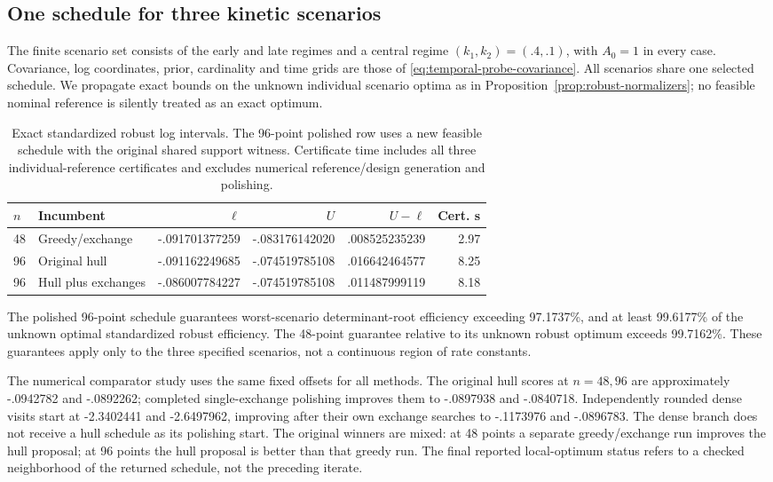 \subsection{One schedule for three kinetic scenarios}\label{subsec:robust-experiments}

The finite scenario set consists of the early and late regimes and a central
regime $(k_1,k_2)=(.4,.1)$, with $A_0=1$ in every case. Covariance, log
coordinates, prior, cardinality and time grids are those of
\eqref{eq:temporal-probe-covariance}. All scenarios share one selected schedule.
We propagate exact bounds on the unknown individual scenario optima as in
Proposition~\ref{prop:robust-normalizers}; no feasible nominal reference is
silently treated as an exact optimum.

\begin{table}[htbp]
\centering\small
\caption{Exact standardized robust log intervals. The 96-point polished row
uses a new feasible schedule with the original shared support witness.
Certificate time includes all three individual-reference certificates and
excludes numerical reference/design generation and polishing.}
\label{tab:robust-certificates}
\begin{tabular}{llrrrr}
\toprule
$n$ & Incumbent & $\ell$ & $U$ & $U-\ell$ & Cert. s\\
\midrule
48 & Greedy/exchange & -.091701377259 & -.083176142020 & .008525235239 & 2.97\\
96 & Original hull & -.091162249685 & -.074519785108 & .016642464577 & 8.25\\
96 & Hull plus exchanges & -.086007784227 & -.074519785108 & .011487999119 & 8.18\\
\bottomrule
\end{tabular}
\end{table}

The polished 96-point schedule guarantees worst-scenario determinant-root
efficiency exceeding 97.1737\%, and at least 99.6177\% of the unknown optimal
standardized robust efficiency. The 48-point guarantee relative to its unknown
robust optimum exceeds 99.7162\%. These guarantees apply only to the three
specified scenarios, not a continuous region of rate constants.

The numerical comparator study uses the same fixed offsets for all methods.
The original hull scores at $n=48,96$ are approximately -.0942782 and
-.0892262; completed single-exchange polishing improves them to -.0897938
and -.0840718. Independently rounded dense visits start at -2.3402441 and
-2.6497962, improving after their own exchange searches to -.1173976 and
-.0896783. The dense branch does not receive a hull schedule as its polishing
start. The original winners are mixed: at 48 points a separate greedy/exchange
run improves the hull proposal; at 96 points the hull proposal is better than
that greedy run. The final reported local-optimum status refers to a checked
neighborhood of the returned schedule, not the preceding iterate.

